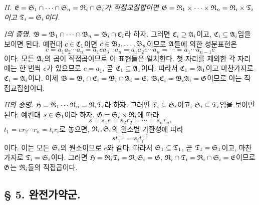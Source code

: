 \emph{II. \(\mE=\mS_1\cap\cdots\cap\mS_n=\mR_i\cap\mS_i\)가 직접교집합이면 \(\mG=\mR_1\times\cdots\times\mR_n=\mR_i\times\mT_i\)이고 \(\mT_i=\mS_i\)이다.}

\emph{I의 증명.} \(\mB=\mB_1\cap\cdots\cap\mB_n=\mB_i\cap\mC_i\)라 하자. 그러면 \(\mC_i\supseteq\mA_i\)이고, \(\mC_i\subseteq\mA_i\)임을 보이면 된다. 예컨대 \(c\in\mC_1\)이면 \(c\in\mathfrak B_2,\ldots,\mathfrak B_n\)이므로 \(\mathfrak A\)들에 의한 성분표현은
\[
        c=a_1a_2\cdots a_n
         =a_1ea_3\cdots a_n
         =a_1a_2e\cdots a_n
         =\cdots
         =a_1\cdots a_{n-1}e
\]
이다. 모든 \(\mathfrak A_i\)의 곱이 직접곱이므로 이 표현들은 일치한다. 첫 자리를 제외한 각 자리에는 한 번씩 \(e\)가 있으므로 \(c=a_1\), 곧 \(\mC_1\subseteq\mA_1\)이다. 따라서 \(\mC_1=\mA_1\)이고 마찬가지로 \(\mC_i=\mA_i\)이다. 이제 \(\mB=\mB_i\cap\mC_i=\mB_i\cap\mA_i=\mE\), \(\mB_i\mC_i=\mB_i\mA_i=\mG\)이므로 이는 직접교집합이다.

\emph{II의 증명.} \(\mH=\mR_1\cdots\mR_n=\mR_i\mT_i\)라 하자. 그러면 \(\mT_i\subseteq\mS_i\)이고, \(\mS_i\subseteq\mT_i\)임을 보이면 된다. 예컨대 \(s\in\mS_1\)이라 하자. \(\mG=\mS_i\times\mR_i\)에 따라
\[
        s=s_1e=s_2r_2=\cdots=s_nr_n.
\]
\(t_1=er_2\cdots r_n=t_ir_i\)로 놓으면, \(\mR_i,\mS_i\)의 원소별 가환성에 따라
\[
        st_1^{-1}=s_it_i^{-1}
\]
이다. 이는 모든 \(\mS_i\)의 원소이므로 \(e\)와 같다. 따라서 \(\mS_1\subseteq\mT_1\), 곧 \(\mT_1=\mS_1\)이고, 마찬가지로 \(\mT_i=\mS_i\)이다. 그러면 \(\mH=\mR_i\mT_i=\mR_i\mS_i=\mG\), \(\mR_i\cap\mT_i=\mR_i\cap\mS_i=\mE\)이므로 \(\mathfrak G\)는 \(\mR_i\)들의 직접곱이다.

\clearpage

\providecommand{\mC}{\mathfrak{C}}
\providecommand{\mD}{\mathfrak{D}}
\providecommand{\mK}{\mathfrak{K}}
\providecommand{\mR}{\mathfrak{R}}
\providecommand{\mS}{\mathfrak{S}}
\providecommand{\mT}{\mathfrak{T}}
\providecommand{\mO}{\mathfrak{O}}
\providecommand{\ma}{\mathfrak{a}}
\providecommand{\mb}{\mathfrak{b}}
\providecommand{\md}{\mathfrak{d}}
\providecommand{\mf}{\mathfrak{f}}
\providecommand{\mh}{\mathfrak{h}}
\providecommand{\mn}{\mathfrak{n}}
\providecommand{\mt}{\mathfrak{t}}
\providecommand{\mx}{\mathfrak{x}}
\providecommand{\mz}{\mathfrak{z}}
\providecommand{\mL}{\mathfrak{L}}
\providecommand{\iso}{\simeq}
\providecommand{\ann}{\operatorname{Ann}}
\providecommand{\tuple}[1]{(#1)}

\subsection*{§ 5. 완전가약군.}

